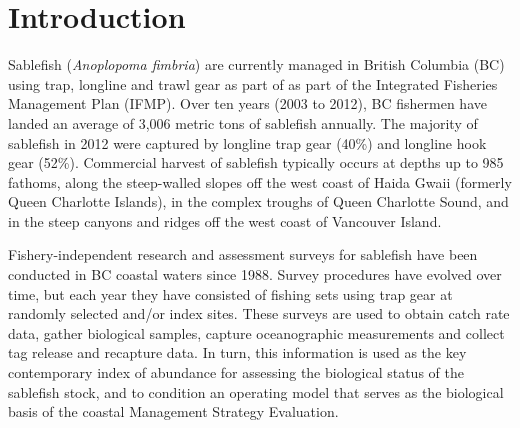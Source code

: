 \documentclass[12pt]{article}\usepackage[]{graphicx}\usepackage[]{color}
\begin{document}

\frontmatter


\renewcommand{\headrulewidth}{0.5pt}  %
\renewcommand{\footrulewidth}{0.5pt}  %

\hypertarget{introduction}{%
\section{Introduction}\label{introduction}}

Sablefish (\emph{Anoplopoma fimbria}) are currently managed in British Columbia (BC) using trap, longline and trawl gear as part of as part of the Integrated Fisheries Management Plan (IFMP). Over ten years (2003 to 2012), BC fishermen have landed an average of 3,006 metric tons of sablefish annually. The majority of sablefish in 2012 were captured by longline trap gear (40\%) and longline hook gear (52\%). Commercial harvest of sablefish typically occurs at depths up to 985 fathoms, along the steep-walled slopes off the west coast of Haida Gwaii (formerly Queen Charlotte Islands), in the complex troughs of Queen Charlotte Sound, and in the steep canyons and ridges off the west coast of Vancouver Island.

Fishery-independent research and assessment surveys for sablefish have been conducted in BC coastal waters since 1988. Survey procedures have evolved over time, but each year they have consisted of fishing sets using trap gear at randomly selected and/or index sites. These surveys are used to obtain catch rate data, gather biological samples, capture oceanographic measurements and collect tag release and recapture data. In turn, this information is used as the key contemporary index of abundance for assessing the biological status of the sablefish stock, and to condition an operating model that serves as the biological basis of the coastal Management Strategy Evaluation.
\end{document}

